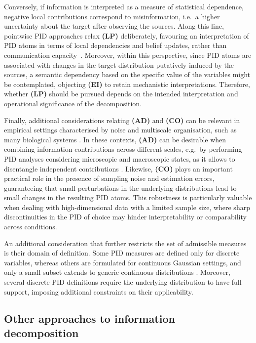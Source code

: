 \documentclass{article}
\newcommand{\AD}{\textbf{(AD)}\xspace} %
\newcommand{\CO}{\textbf{(CO)}\xspace} %
\newcommand{\EI}{\textbf{(EI)}\xspace} %
\newcommand{\LP}{\textbf{(LP)}\xspace}
\begin{document}
Conversely, if information is interpreted as a measure of statistical dependence, negative local contributions correspond to misinformation, i.e.\ a higher uncertainty about the target after observing the sources. 
Along this line, pointwise PID approaches relax \LP deliberately, favouring an interpretation of PID atoms in terms of local dependencies and belief updates, rather than communication capacity~\cite{ince2017measuring, finn2018pointwise, makkeh2021introducing}. 
Moreover, within this perspective, since PID atoms are associated with changes in the target distribution putatively induced by the sources, a semantic dependency based on the specific value of the variables might be contemplated, objecting \EI to retain mechanistic interpretations.
Therefore, whether \LP should be pursued depends on the intended interpretation and operational significance of the decomposition.

Finally, additional considerations relating \AD and \CO can be relevant in empirical settings characterised by noise and multiscale organisation, such as many biological systems \cite{walpole2013multiscale, dada2011multi}. In these contexts, \AD can be desirable when combining information contributions across different scales, e.g.\ by performing PID analyses considering microscopic and macroscopic states, as it allows to disentangle independent contributions \cite{liardi2025simple}.
Likewise, \CO plays an important practical role in the presence of sampling noise and estimation errors, guaranteeing that small perturbations in the underlying distributions lead to small changes in the resulting PID atoms. This robustness is particularly valuable when dealing with high-dimensional data with a limited sample size, where sharp discontinuities in the PID of choice may hinder interpretability or comparability across conditions. 

An additional consideration that further restricts the set of admissible measures is their domain of definition. Some PID measures are defined only for discrete variables, whereas others are formulated for continuous Gaussian settings, and only a small subset extends to generic continuous distributions \cite{ehrlich2024partial}. Moreover, several discrete PID definitions require the underlying distribution to have full support, imposing additional constraints on their applicability.


\subsection{Other approaches to information decomposition}
\label{sec:other_approaches}
\end{document}
